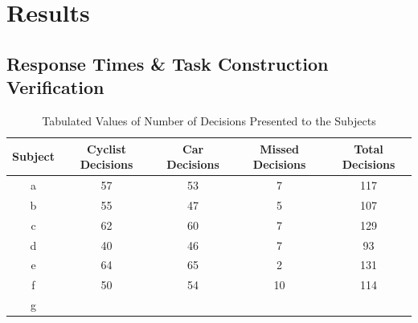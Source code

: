 \chapter{Results}

\section{Response Times \& Task Construction Verification}
\begin{table}[hbt!]
    \begin{center}
        \caption{Tabulated Values of Number of Decisions Presented to the Subjects}
        \begin{tabular}{|c|c|c|c|c|}
        \hline
        Subject &   Cyclist Decisions   & Car Decisions & Missed Decisions & Total Decisions \\ \hline
        a       &   57  & 53    & 7     & 117   \\ \hline
        b       &   55  & 47    & 5     & 107   \\ \hline
        c       &   62  & 60    & 7     & 129   \\ \hline
        d       &   40  & 46    & 7     & 93    \\ \hline
        e       &   64  & 65    & 2     & 131   \\ \hline
        f       &   50  & 54    & 10    & 114   \\ \hline
        g       &       &       &       &       \\ \hline
        \end{tabular}
    \end{center}
\end{table}


